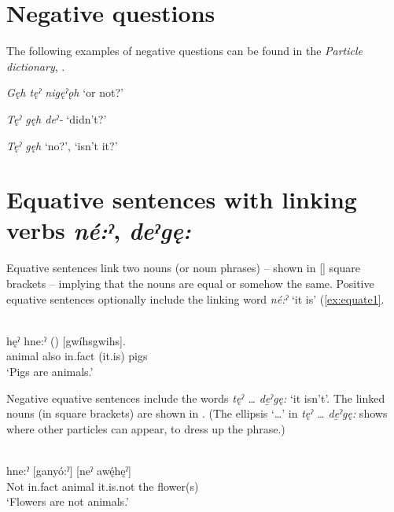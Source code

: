 \section{Negative questions} \label{Negative question}

The following examples of negative questions can be found in the \textit{Particle dictionary}, .

\begin{CayugaRelated}
\item{}\textit{Gęh tęˀ nigęˀǫh} ‘or not?’\\
\item{}\textit{Tęˀ gęh deˀ-} ‘didn't?’\\
\item{}\textit{Tęˀ gęh} ‘no?’, ‘isn't it?’
\end{CayugaRelated}



\section{Equative sentences with linking verbs \textit{né:ˀ}, \textit{deˀgę:}} \label{Equative sentences with linking verbs [né:ˀ], [deˀgę:]}
Equative sentences link two nouns (or noun phrases) -- shown in [] square brackets -- implying that the nouns are equal or somehow the same. Positive equative sentences optionally include the linking word \textit{né:ˀ} ‘it is’ (\ref{ex:equate1}. 

\ea\label{ex:equate1} {} \\

\gll [Ganyó:ˀ] hęˀ hne:ˀ () [gwíhsgwihs].\\
animal also in.fact (it.is) pigs\\
\glt ‘Pigs are animals.’
\z


Negative equative sentences include the words \textit{tęˀ … de̱ˀgę:} ‘it isn't’. The linked nouns (in square brackets) are shown in . (The ellipsis ‘…’ in \textit{tęˀ … de̱ˀgę:} shows where other particles can appear, to dress up the phrase.)

\ea\label{ex:equate2} {} \\

\gll {} hne:ˀ [ganyó:ˀ]  [neˀ awę́hęˀ] \\
Not in.fact animal it.is.not the flower(s)\\
\glt ‘Flowers are not animals.’
\z


